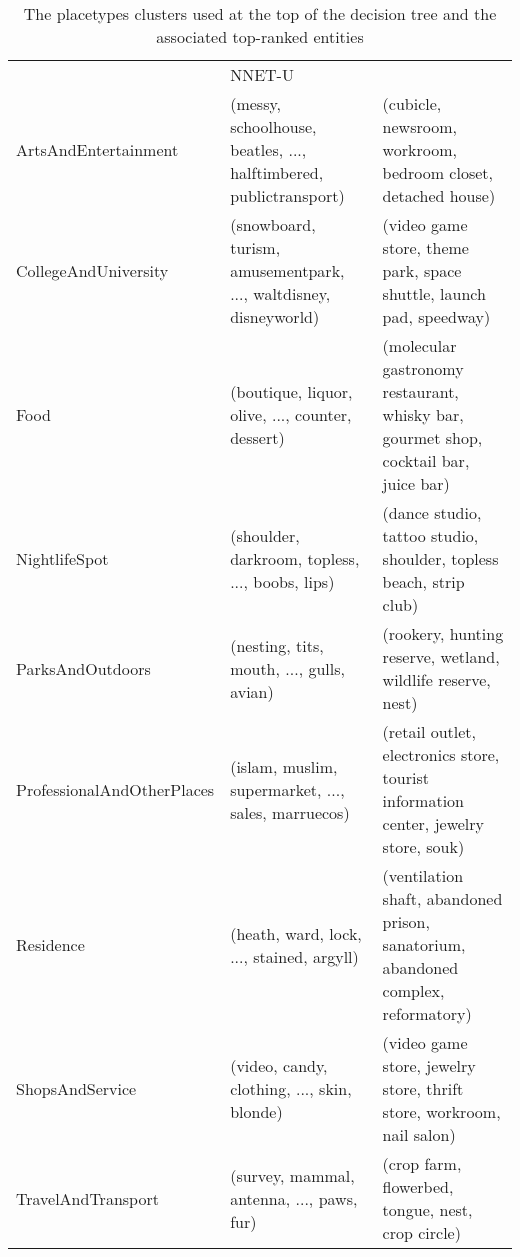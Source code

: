 \begin{landscape}
\begin{table}[]
\begin{tabular}{lll}
& NNET-U                                                                                    &                                                                                                     \\
ArtsAndEntertainment       & (messy, schoolhouse, beatles, ..., halftimbered, publictransport)                         & (cubicle, newsroom, workroom, bedroom closet, detached house)                                       \\
CollegeAndUniversity       & (snowboard, turism, amusementpark, ..., waltdisney, disneyworld)                          & (video game store, theme park, space shuttle, launch pad, speedway)                                 \\
Food                       & (boutique, liquor, olive, ..., counter, dessert)                                          & (molecular gastronomy restaurant, whisky bar, gourmet shop, cocktail bar, juice bar)                \\
NightlifeSpot              & (shoulder, darkroom, topless, ..., boobs, lips)                                           & (dance studio, tattoo studio, shoulder, topless beach, strip club)                                  \\
ParksAndOutdoors           & (nesting, tits, mouth, ..., gulls, avian)                                                 & (rookery, hunting reserve, wetland, wildlife reserve, nest)                                         \\
ProfessionalAndOtherPlaces & (islam, muslim, supermarket, ..., sales, marruecos)                                       & (retail outlet, electronics store, tourist information center, jewelry store, souk)                 \\
Residence                  & (heath, ward, lock, ..., stained, argyll)                                                 & (ventilation shaft, abandoned prison, sanatorium, abandoned complex, reformatory)                   \\
ShopsAndService            & (video, candy, clothing, ..., skin, blonde)                                               & (video game store, jewelry store, thrift store, workroom, nail salon)                               \\
TravelAndTransport         & (survey, mammal, antenna, ..., paws, fur)                                                 & (crop farm, flowerbed, tongue, nest, crop circle)                                                  
                                              
	\end{tabular}\caption{The placetypes clusters used at the top of the decision tree and the associated top-ranked entities}\label{ch5:placeent}
\end{table}
\end{landscape}


